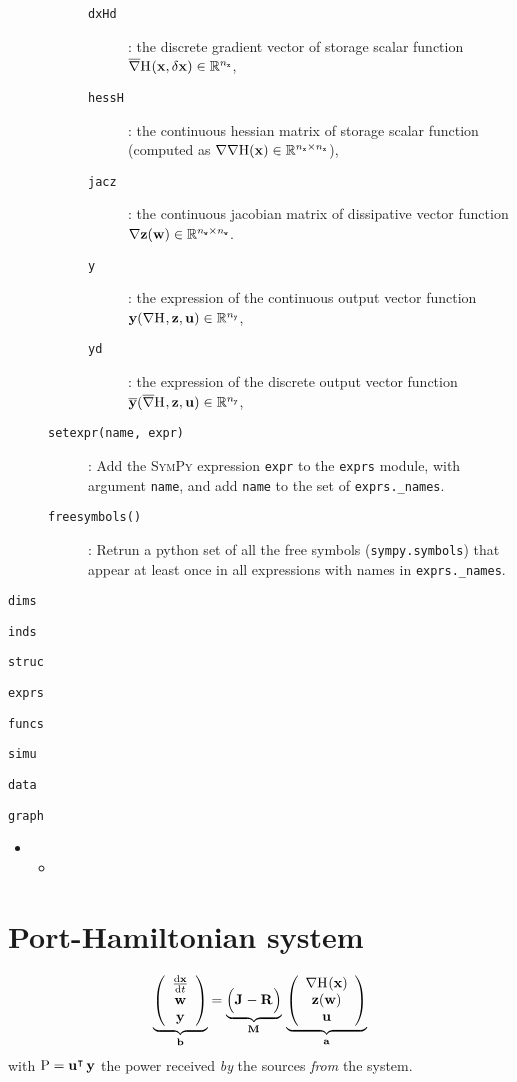 \documentclass[10pt,a4paper]{article}
\begin{document}
\begin{description}
\begin{description}
\begin{description}
\begin{description}
\item[\texttt{dxHd}]: the discrete gradient vector of storage scalar function $\overline{\nabla}{\mathrm{H}}_{\mathtt{}}({\mathbf{x}}, \delta{\mathbf{x}})\in\mathbb{R}^{{n_{\mathtt{x}}}}$,
\item[\texttt{hessH}]: the continuous hessian matrix of storage scalar function (computed as $\nabla\nabla{\mathrm{H}}({\mathbf{x}})\in\mathbb{R}^{{n_{\mathtt{x}}}\times{n_{\mathtt{x}}}}$),
\item[\texttt{jacz}]: the continuous jacobian matrix of dissipative vector function $\nabla{\mathbf{z}}({\mathbf{w}})\in\mathbb{R}^{{n_{\mathtt{w}}}\times{n_{\mathtt{w}}}}$.
\item[\texttt{y}]: the expression of the continuous output vector function ${\mathbf{y}}(\nabla{\mathrm{H}}_{\mathtt{}}, {\mathbf{z}}, {\mathbf{u}})\in\mathbb{R}^{n_{\mathtt{y}}}$,
\item[\texttt{yd}]: the expression of the discrete output vector function $\overline{{\mathbf{y}}}(\overline{\nabla}{\mathrm{H}}_{\mathtt{}}, {\mathbf{z}}, {\mathbf{u}})\in\mathbb{R}^{n_{\mathtt{y}}}$,
\end{description}
%
\item[\texttt{setexpr(name, expr)}]: Add the \textsc{SymPy} expression \texttt{expr} to the \texttt{exprs} module, with argument 
\texttt{name}, and add \texttt{name} to the set of \texttt{exprs.\_names}.
%
\item[\texttt{freesymbols()}]: Retrun a python set of all the free symbols (\texttt{sympy.symbols}) that appear at least once in all expressions with names in \texttt{exprs.\_names}.
\end{description}
%
\end{description}
%
\item \texttt{dims}
%
\item \texttt{inds}
%
\item \texttt{struc}
%
\item \texttt{exprs}
%
\item \texttt{funcs}
%
\item \texttt{simu}
%
\item \texttt{data}
%
\item \texttt{graph}
%
\begin{itemize}
%
\item 
%
\begin{itemize}
%
\item
%
\end{itemize}
%
\end{itemize}
%
\end{description}
%
%
\section{Port-Hamiltonian system}
%
%
%
%
\begin{equation}
\underbrace{\left(
\begin{array}{c}
\frac{\mathrm{d} {\mathbf{x}}}{\mathrm{d} t}\\
{\mathbf{w}}\\
{\mathbf{y}}
\end{array}
\right)}_{\mathbf{b}}
=
\underbrace{\Big(\mathbf{J}_{\mathtt{}}-\mathbf{R}_{\mathtt{}}\Big)}_{\mathbf{M}_{\mathtt{}}}
\,
\underbrace{\left(
\begin{array}{c}
\nabla{\mathrm{H}}_{\mathtt{}}({\mathbf{x}})\\
{\mathbf{z}}({\mathbf{w}})\\
{\mathbf{u}}
\end{array}
\right)
}_{\mathbf{a}}
\end{equation}
%
%
with $\mathrm{P}={\mathbf{u}}^\intercal\,{\mathbf{y}}$ the power received \emph{by} the sources \emph{from} the system.
%
%
%
\end{document}
